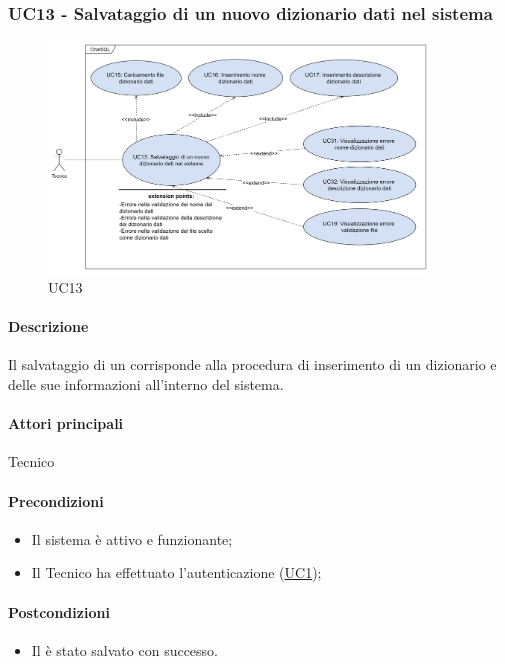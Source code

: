 \subsubsection{UC13 - Salvataggio di un nuovo dizionario dati nel sistema}\label{UC13}

\begin{figure}[H]
  \centering
  \includegraphics[width=0.90\textwidth]{assets/uc13.png}
  \caption{UC13}
\end{figure}

\paragraph*{Descrizione}
Il salvataggio di un  corrisponde alla procedura di inserimento di un dizionario e delle sue informazioni all'interno del sistema.

\paragraph*{Attori principali}
Tecnico

\paragraph*{Precondizioni}
\begin{itemize}
  \item Il sistema è attivo e funzionante;
  \item Il Tecnico ha effettuato l'autenticazione (\hyperref[UC1]{UC1});
\end{itemize}

\paragraph*{Postcondizioni}
\begin{itemize}
  \item Il  è stato salvato con successo.
\end{itemize}

